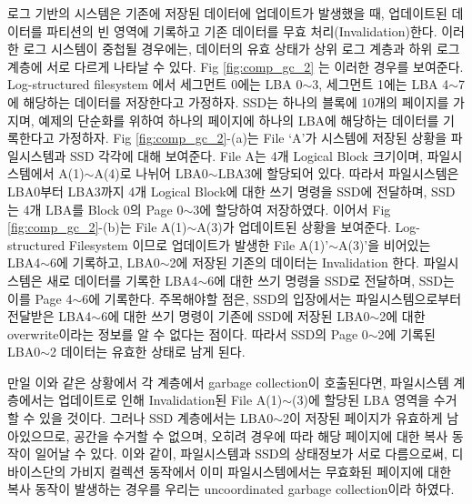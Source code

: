 \documentclass[letterpaper,twocolumn,10pt]{article}
\begin{document}
로그 기반의 시스템은 기존에 저장된 데이터에 업데이트가 발생했을 때, 업데이트된 데이터를 파티션의 빈 영역에 기록하고 기존 데이터를 무효 처리(Invalidation)한다. 이러한 로그 시스템이 중첩될 경우에는, 데이터의 유효 상태가 상위 로그 계층과 하위 로그 계층에 서로 다르게 나타날 수 있다. Fig \ref{fig:comp_gc_2} 는 이러한 경우를 보여준다. Log-structured filesystem 에서 세그먼트 0에는 LBA 0$\sim$3, 세그먼트 1에는 LBA 4$\sim$7에 해당하는 데이터를 저장한다고 가정하자. SSD는 하나의 블록에 10개의 페이지를 가지며, 예제의 단순화를 위하여 하나의 페이지에 하나의 LBA에 해당하는 데이터를 기록한다고 가정하자. Fig \ref{fig:comp_gc_2}-(a)는 File `A'가 시스템에 저장된 상황을 파일시스템과 SSD 각각에 대해 보여준다. File A는 4개 Logical Block 크기이며, 파일시스템에서 A(1)$\sim$A(4)로 나뉘어 LBA0$\sim$LBA3에 할당되어 있다. 따라서 파일시스템은 LBA0부터 LBA3까지 4개 Logical Block에 대한 쓰기 명령을 SSD에 전달하며, SSD는 4개 LBA를 Block 0의 Page 0$\sim$3에 할당하여 저장하였다. 이어서 Fig \ref{fig:comp_gc_2}-(b)는 File A(1)$\sim$A(3)가 업데이트된 상황을 보여준다. Log-structured Filesystem 이므로 업데이트가 발생한 File A(1)'$\sim$A(3)'을 비어있는 LBA4$\sim$6에 기록하고, LBA0$\sim$2에 저장된 기존의 데이터는 Invalidation 한다. 파일시스템은 새로 데이터를 기록한 LBA4$\sim$6에 대한 쓰기 명령을 SSD로 전달하며, SSD는 이를 Page 4$\sim$6에 기록한다. 주목해야할 점은, SSD의 입장에서는 파일시스템으로부터 전달받은 LBA4$\sim$6에 대한 쓰기 명령이 기존에 SSD에 저장된 LBA0$\sim$2에 대한 overwrite이라는 정보를 알 수 없다는 점이다. 따라서 SSD의 Page 0$\sim$2에 기록된 LBA0$\sim$2 데이터는 유효한 상태로 남게 된다.

만일 이와 같은 상황에서 각 계층에서 garbage collection이 호출된다면, 파일시스템 계층에서는 업데이트로 인해 Invalidation된 File A(1)$\sim$(3)에 할당된 LBA 영역을 수거할 수 있을 것이다. 그러나 SSD 계층에서는 LBA0$\sim$2이 저장된 페이지가 유효하게 남아있으므로, 공간을 수거할 수 없으며, 오히려 경우에 따라 해당 페이지에 대한 복사 동작이 일어날 수 있다. 이와 같이, 파일시스템과 SSD의 상태정보가 서로 다름으로써, 디바이스단의 가비지 컬렉션 동작에서 이미 파일시스템에서는 무효화된 페이지에 대한 복사 동작이 발생하는 경우를 우리는 uncoordinated garbage collection이라 하였다.
\end{document}
